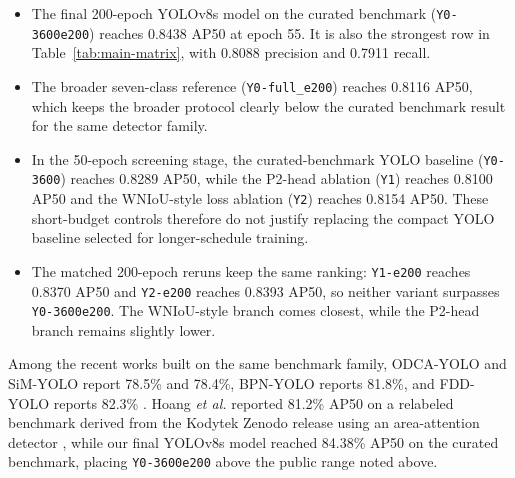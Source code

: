 \documentclass[10pt,a4paper]{article}
\begin{document}
\begin{itemize}[leftmargin=1.5em]
  \item The final 200-epoch YOLOv8s model on the curated benchmark (\texttt{Y0-3600e200}) reaches 0.8438 AP50 at epoch 55. It is also the strongest row in Table~\ref{tab:main-matrix}, with 0.8088 precision and 0.7911 recall.
  \item The broader seven-class reference (\texttt{Y0-full\_e200}) reaches 0.8116 AP50, which keeps the broader protocol clearly below the curated benchmark result for the same detector family.
  \item In the 50-epoch screening stage, the curated-benchmark YOLO baseline (\texttt{Y0-3600}) reaches 0.8289 AP50, while the P2-head ablation (\texttt{Y1}) reaches 0.8100 AP50 and the WNIoU-style loss ablation (\texttt{Y2}) reaches 0.8154 AP50. These short-budget controls therefore do not justify replacing the compact YOLO baseline selected for longer-schedule training.
  \item The matched 200-epoch reruns keep the same ranking: \texttt{Y1-e200} reaches 0.8370 AP50 and \texttt{Y2-e200} reaches 0.8393 AP50, so neither variant surpasses \texttt{Y0-3600e200}. The WNIoU-style branch comes closest, while the P2-head branch remains slightly lower.
\end{itemize}

Among the recent works built on the same benchmark family, ODCA-YOLO and SiM-YOLO report 78.5\% and 78.4\%, BPN-YOLO reports 81.8\%, and FDD-YOLO reports 82.3\% \citep{odca_yolo,bpn_yolo,sim_yolo,fdd_yolo}. Hoang \textit{et al.} reported 81.2\% AP50 on a relabeled benchmark derived from the Kodytek Zenodo release using an area-attention detector \citep{cmc_wood_area_attention}, while our final YOLOv8s model reached 84.38\% AP50 on the curated benchmark, placing \texttt{Y0-3600e200} above the public range noted above. 
\end{document}
